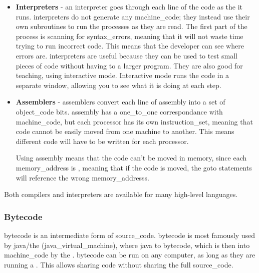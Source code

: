 \begin{itemize}
                \item \textbf{Interpreters} - an \gls{interpreter} goes through each line of the \gls{code} as the it runs.
                \Glspl{interpreter} do not generate any \gls{machine_code}; they instead use their own \glspl{subroutine} to run the processes as they are read.
                The first part of the  process is scanning for \glspl{syntax_error}, meaning that it will not waste time trying to run incorrect \gls{code}.
                This means that the developer can see where \glspl{error} are.
                \Glspl{interpreter} are useful because they can be used to test small pieces of code without having to  a larger program.
                They are also good for teaching, using interactive mode.
                Interactive mode runs the \gls{code} in a separate window, allowing you to see what it is doing at each step.
                
                \item \textbf{Assemblers} - \glspl{assembler} convert each line of \gls{assembly} into a set of \gls{object_code} bits.
                \Gls{assembly} has a \gls{one_to_one} correspondance with \gls{machine_code}, but each \gls{processor} has its own \gls{instruction_set}, meaning that \gls{code} cannot be easily moved from one machine to another.
                This means different code will have to be written for each processor.

                Using \gls{assembly} means that the \gls{code} can't be moved in \gls{memory}, since each \gls{memory_address} is , meaning that if the code is moved, the goto statements will reference the wrong \glspl{memory_address}.
            \end{itemize}
            Both \glspl{compiler} and \glspl{interpreter} are available for many high-level languages.

        \subsubsection{Bytecode}
            \Gls{bytecode} is an intermediate form of \gls{source_code}.
            \Gls{bytecode} is most famously used by \gls{java}/the \acroJVM (\gls{java_virtual_machine}), where \gls{java}  to \gls{bytecode}, which is then  into \gls{machine_code} by the \acroJVM.
            \Gls{bytecode} can be run on any computer, as long as they are running a \acroJVM.
            This allows sharing \gls{code} without sharing the full \gls{source_code}.
            
